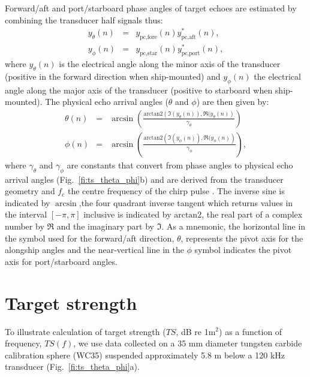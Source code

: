 \documentclass[preprint,12pt,TurnOnLineNumbers]{JASAnew}
\newcommand{\samplesymt}{n}
\newcommand{\fc}{f_{\textrm{c}}}
\newcommand{\athw}{\phi}
\newcommand{\along}{\theta}
\newcommand{\atan}{\textrm{arctan2}}
\newcommand{\anglefalong}{\gamma_\along}
\newcommand{\anglefathw}{\gamma_\athw}
\begin{document}
Forward/aft and port/starboard phase angles of target echoes are estimated by combining the transducer half signals thus: 
%
\begin{eqnarray}
\label{eq:phase1}
y_\along(\samplesymt) & = & y_{\textrm{pc,fore}}(\samplesymt) y_{\textrm{pc,aft}}^*(\samplesymt), \\
y_\athw(\samplesymt) & = & y_{\textrm{pc,star}}(\samplesymt) y_{\textrm{pc,port}}^*(\samplesymt),
\end{eqnarray}
%
where $y_\along(\samplesymt)$ is the electrical angle along the minor axis of the transducer (positive in the forward direction when ship-mounted) and $y_\athw(\samplesymt)$ the electrical angle along the major axis of the transducer (positive to starboard when ship-mounted). The physical echo arrival angles ($\along$ and $\athw$) are then given by:
%
\begin{eqnarray}
\label{eq:phase2}
\along(\samplesymt) & = & \arcsin\left( \frac{\atan\left( \Im(y_\along(\samplesymt)), \Re(y_\along(\samplesymt) \right)}{\anglefalong}\right) \\
\athw(\samplesymt) & = & \arcsin\left( \frac{\atan\left( \Im(y_\athw(\samplesymt)), \Re(y_\athw(\samplesymt) \right)}{\anglefathw}\right),
\end{eqnarray}
%
where $\anglefalong$ and $\anglefathw$ are constants that convert from phase angles to physical echo arrival angles (Fig.~\ref{fi:ts_theta_phi}b) and are derived from the transducer geometry \citep{Urick3rdPrinciples} and $\fc$ the centre frequency of the chirp pulse \citep{ehrenberg1979}. The inverse sine is indicated by $\arcsin$,the four quadrant inverse tangent which returns values in the interval $[-\pi, \pi]$ inclusive is indicated by $\atan$, the real part of a complex number by $\Re$ and the imaginary part by $\Im$. As a mnemonic, the horizontal line in the symbol used for the forward/aft direction, $\along$, represents the pivot axis for the alongship angles and the near-vertical line in the $\athw$ symbol indicates the pivot axis for port/starboard angles.
%

\clearpage
\section{Target strength}

To illustrate calculation of target strength ($TS$, dB re 1m$^2$) as a function of frequency, $TS(f)$, we use data collected on a 35 mm diameter tungsten carbide calibration sphere (WC35) suspended approximately 5.8 m below a 120 kHz transducer (Fig.~\ref{fi:ts_theta_phi}a). 
\end{document}
